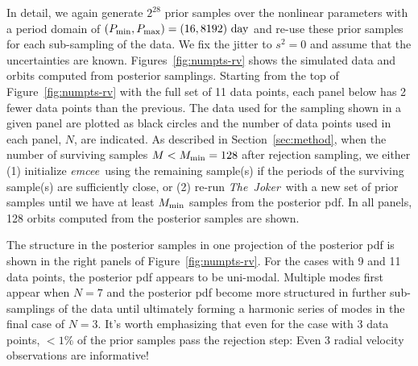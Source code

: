 \documentclass[manuscript, letterpaper]{aastex6}
\newcommand{\project}[1]{\textsl{#1}}
\newcommand{\samplername}{\project{The~Joker}}
\newcommand{\emcee}{\project{emcee}}
\newcommand{\sectionname}{Section}
\newcommand{\figname}{Figure}
\begin{document}
In detail, we again generate $2^{28}$ prior samples over the nonlinear
parameters with a period domain of $(P_{\rm min}, P_{\rm max}) = (16, 8192)~{\rm
day}$ and re-use these prior samples for each sub-sampling of the data.
We fix the jitter to $s^2 = 0$ and assume that the uncertainties are known.
\figname s~\ref{fig:numpts-rv} shows the simulated data and orbits computed from
posterior samplings.
Starting from the top of \figname~\ref{fig:numpts-rv} with the full set of 11
data points, each panel below has 2 fewer data points than the previous.
The data used for the sampling shown in a given panel are plotted as black
circles and the number of data points used in each panel, $N$, are indicated.
As described in \sectionname~\ref{sec:method}, when the number of surviving
samples $M < M_{\rm min}=128$ after rejection sampling, we either (1) initialize
\emcee\ using the remaining sample(s) if the periods of the surviving sample(s)
are sufficiently close, or (2) re-run \samplername\ with a new set of prior
samples until we have at least $M_{\rm min}$ samples from the posterior pdf.
In all panels, 128 orbits computed from the posterior samples are shown.

The structure in the posterior samples in one projection of the posterior pdf is
shown in the right panels of \figname~\ref{fig:numpts-rv}.
For the cases with 9 and 11 data points, the posterior pdf appears to be
uni-modal.
Multiple modes first appear when $N=7$ and the posterior pdf become more
structured in further sub-samplings of the data until ultimately forming a
harmonic series of modes in the final case of $N=3$.
It's worth emphasizing that even for the case with 3 data points, $<1\%$ of the
prior samples pass the rejection step:
Even 3 radial velocity observations are informative!
\end{document}
